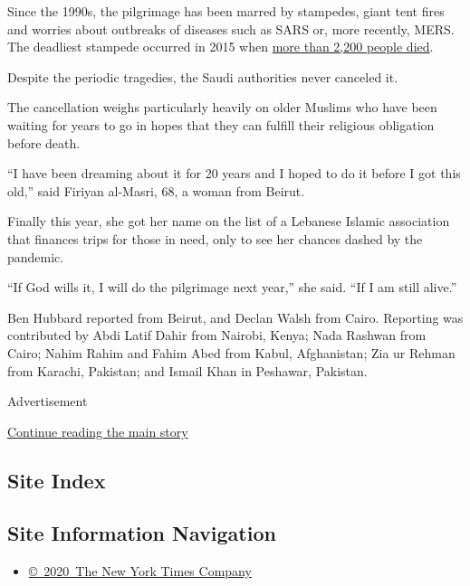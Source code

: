 Since the 1990s, the pilgrimage has been marred by stampedes, giant tent
fires and worries about outbreaks of diseases such as SARS or, more
recently, MERS. The deadliest stampede occurred in 2015 when
\href{https://www.nytimes3xbfgragh.onion/2015/12/11/world/middleeast/death-toll-from-hajj-stampede.html}{more
than 2,200 people died}.

Despite the periodic tragedies, the Saudi authorities never canceled it.

The cancellation weighs particularly heavily on older Muslims who have
been waiting for years to go in hopes that they can fulfill their
religious obligation before death.

``I have been dreaming about it for 20 years and I hoped to do it before
I got this old,'' said Firiyan al-Masri, 68, a woman from Beirut.

Finally this year, she got her name on the list of a Lebanese Islamic
association that finances trips for those in need, only to see her
chances dashed by the pandemic.

``If God wills it, I will do the pilgrimage next year,'' she said. ``If
I am still alive.''

Ben Hubbard reported from Beirut, and Declan Walsh from Cairo. Reporting
was contributed by Abdi Latif Dahir from Nairobi, Kenya; Nada Rashwan
from Cairo; Nahim Rahim and Fahim Abed from Kabul, Afghanistan; Zia ur
Rehman from Karachi, Pakistan; and Ismail Khan in Peshawar, Pakistan.

Advertisement

\protect\hyperlink{after-bottom}{Continue reading the main story}

\hypertarget{site-index}{%
\subsection{Site Index}\label{site-index}}

\hypertarget{site-information-navigation}{%
\subsection{Site Information
Navigation}\label{site-information-navigation}}

\begin{itemize}
\tightlist
\item
  \href{https://help.nytimes3xbfgragh.onion/hc/en-us/articles/115014792127-Copyright-notice}{©~2020~The
  New York Times Company}
\end{itemize}

